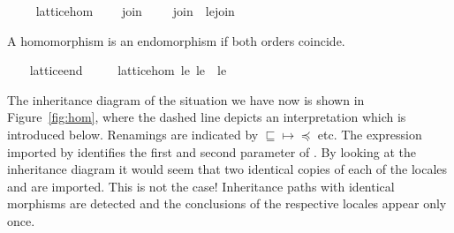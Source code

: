 \begin{isabellebody}
\ \ \isamarkupfalse%
\ {\isacharparenleft}\ lattice{\isacharunderscore}hom{\isacharparenright}\isanewline
\ \ \ \ join{\isacharprime}\ {\isacharparenleft}\ {\isachardoublequoteopen}{\isasymsqunion}{\isacharprime}{\isacharprime}{\isachardoublequoteclose}\ {}{}{\isacharparenright}\ \ {\isachardoublequoteopen}join{\isacharprime}\ {\isasymequiv}\ le{\isacharprime}{\isachardot}join{\isachardoublequoteclose}%
\begin{isamarkuptext}%
A homomorphism is an endomorphism if both orders coincide.%
\end{isamarkuptext}%
\isamarkuptrue%
\ \ \isamarkupfalse%
\ lattice{\isacharunderscore}end\ {\isacharequal}\isanewline
\ \ \ \ lattice{\isacharunderscore}hom\ le\ le\ \ le\ {\isacharparenleft}\ {\isachardoublequoteopen}{\isasymsqsubseteq}{\isachardoublequoteclose}\ {}{}{\isacharparenright}%
\begin{isamarkuptext}%
The inheritance diagram of the situation we have now is shown
  in Figure~\ref{fig:hom}, where the dashed line depicts an
  interpretation which is introduced below.  Renamings are
  indicated by $\sqsubseteq \mapsto \preceq$ etc.  The expression
  imported by  identifies the first and second
  parameter of .  By looking at the inheritance diagram it would seem
  that two identical copies of each of the locales  and  are imported.  This is not the
  case!  Inheritance paths with identical morphisms are detected and
  the conclusions of the respective locales appear only once.


\end{isamarkuptext}
\end{isabellebody}
